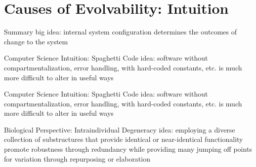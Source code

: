 \section{Causes of Evolvability: Intuition}

\begin{frame}{Summary}
  \alert{big idea}: internal system configuration determines the outcomes of change to the system
\end{frame}


\begin{frame}{Computer Science Intuition: Spaghetti Code}
  idea: software without compartmentalization, error handling, with hard-coded constants, etc. is much more difficult to alter in useful ways
  
\end{frame}

\begin{frame}{Computer Science Intuition: Spaghetti Code}
  idea: software without compartmentalization, error handling, with hard-coded constants, etc. is much more difficult to alter in useful ways
  
\end{frame}

\begin{frame}{Biological Perspective: Intraindividual Degeneracy}
  idea: employing a diverse collection of substructures that provide identical or near-identical functionality promote robustness through redundancy while providing many jumping off points for variation through repurposing or elaboration
  
\end{frame}
